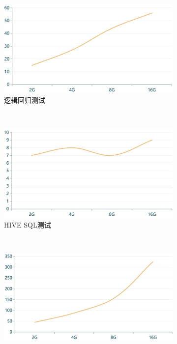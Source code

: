 \begin{figure}[!htbp]
    \centering
    \begin{subfigure}[b]{0.45\linewidth}
      \includegraphics[width=\textwidth]{Img/lr-ac-2.jpg}
      \caption{逻辑回归测试}
      \label{fig:lr-ac-2}
    \end{subfigure}%
    ~%
    \begin{subfigure}[b]{0.45\linewidth}
      \includegraphics[width=\textwidth]{Img/hive-ac-2.jpg}
      \caption{HIVE SQL测试}
      \label{fig:hive-ac-2}
    \end{subfigure}
    \\%
    \begin{subfigure}[b]{0.45\linewidth}
      \includegraphics[width=\textwidth]{Img/pagerank-ac-2.jpg}

\end{subfigure}
\end{figure}
